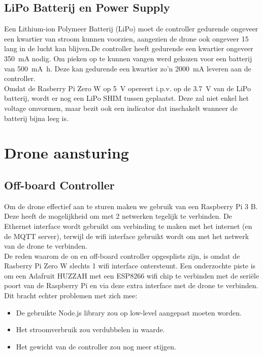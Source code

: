 \subsection{LiPo Batterij en Power Supply} \label{sec:lipo}
Een Lithium-ion Polymeer Batterij (LiPo) moet de controller gedurende ongeveer een kwartier van stroom kunnen voorzien, aangezien de drone ook ongeveer \SI{15}{\min} lang in de lucht kan blijven.De controller heeft gedurende een kwartier ongeveer \SI{350}{\mA} nodig. Om pieken op te kunnen vangen werd gekozen voor een batterij van \SI{500}{\mA\hour}. Deze kan gedurende een kwartier zo'n \SI{2000}{\mA} leveren aan de controller.\\

Omdat de Rasberry Pi Zero W op \SI{5}{\V} opereert i.p.v. op de \SI{3.7}{\V} van de LiPo batterij, wordt er nog een LiPo SHIM tussen geplaatst. Deze zal niet enkel het voltage omvormen, maar bezit ook een indicator dat inschakelt wanneer de batterij bijna leeg is.

\section{Drone aansturing} \label{sec:drone_control}
\subsection{Off-board Controller} \label{sec:offboard_controller}
Om de drone effectief aan te sturen maken we gebruik van een Raspberry Pi 3 B.
Deze heeft de mogelijkheid om met 2 netwerken tegelijk te verbinden. De Ethernet interface wordt gebruikt om verbinding te maken met het internet (en de MQTT server), terwijl de wifi interface gebruikt wordt om met het netwerk van de drone te verbinden.\\

De reden waarom de on en off-board controller opgesplists zijn, is omdat de Rasberry Pi Zero W slechts 1 wifi interface ontersteunt.
Een onderzochte piste is om een Adafruit HUZZAH met een ESP8266 wifi chip te verbinden met de seri\"ele poort van de Raspberry Pi en via deze extra interface met de drone te verbinden.\\
Dit bracht echter problemen met zich mee:
\begin{itemize}
	\item De gebruikte Node.js library zou op low-level aangepast moeten worden.
	\item Het stroomverbruik zou verdubbelen in waarde.
	\item Het gewicht van de controller zou nog meer stijgen.
\end{itemize}


